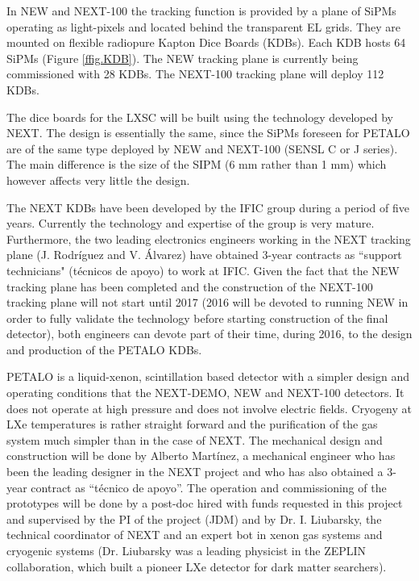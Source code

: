 In NEW and NEXT-100 the tracking function is provided by a plane of SiPMs operating as light-pixels and located behind the transparent EL grids. They are mounted on flexible radiopure Kapton Dice Boards (KDBs). Each KDB hosts 64 SiPMs (Figure  \ref{ffig.KDB}). The NEW  tracking plane is currently being commissioned with 28 KDBs. The NEXT-100 tracking plane will deploy 112 KDBs.  

The dice boards for the LXSC will be built using the technology developed by NEXT. The design is essentially the same, since the SiPMs foreseen for PETALO are of the same type deployed by NEW and NEXT-100 (SENSL C or J series). The main difference is the size of the SIPM (6 mm rather than 1 mm) which however affects very little the design. 

The NEXT KDBs have been developed by the IFIC group during a period of five years. Currently the technology and expertise of the group is very mature. Furthermore, the two leading electronics engineers working in the NEXT tracking plane (J. Rodríguez and V. Álvarez) have obtained 3-year contracts as ``support technicians" (técnicos de apoyo) to work at IFIC. Given the fact that the NEW tracking plane has been completed and the construction of the NEXT-100 tracking plane will not start until 2017 (2016 will be devoted to running NEW in order to fully validate the technology before starting construction of the final detector), both engineers can devote part of their time, during 2016, to the design and production of the PETALO KDBs. 

PETALO is a liquid-xenon, scintillation based detector with a simpler design and operating conditions  that the NEXT-DEMO, NEW and NEXT-100 detectors. It does not operate at high pressure and does not involve electric fields. Cryogeny at LXe temperatures is rather straight forward and the purification of the gas system much simpler than in the case of NEXT. The mechanical design and construction will be done by Alberto Martínez, a mechanical engineer who has been the leading designer in the NEXT project and who has also obtained a 3-year contract as ``técnico de apoyo''. The operation and commissioning of the prototypes will be done by a post-doc hired with funds requested in this project and supervised by the PI of the project (JDM) and by Dr. I. Liubarsky, the technical coordinator of NEXT and an expert bot in xenon gas systems and cryogenic systems (Dr. Liubarsky was a leading physicist in the  ZEPLIN collaboration, which built a pioneer LXe detector for dark matter searchers). 

